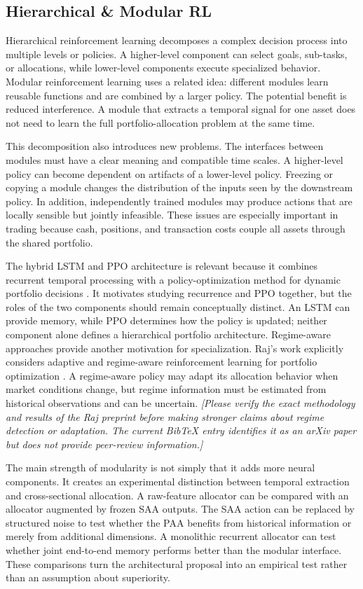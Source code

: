 \subsection{Hierarchical \& Modular RL}


Hierarchical reinforcement learning decomposes a complex decision process into multiple levels or policies. A higher-level component can select goals, sub-tasks, or allocations, while lower-level components execute specialized behavior. Modular reinforcement learning uses a related idea: different modules learn reusable functions and are combined by a larger policy. The potential benefit is reduced interference. A module that extracts a temporal signal for one asset does not need to learn the full portfolio-allocation problem at the same time.

This decomposition also introduces new problems. The interfaces between modules must have a clear meaning and compatible time scales. A higher-level policy can become dependent on artifacts of a lower-level policy. Freezing or copying a module changes the distribution of the inputs seen by the downstream policy. In addition, independently trained modules may produce actions that are locally sensible but jointly infeasible. These issues are especially important in trading because cash, positions, and transaction costs couple all assets through the shared portfolio.

The hybrid LSTM and PPO architecture is relevant because it combines recurrent temporal processing with a policy-optimization method for dynamic portfolio decisions \cite{JunKevin.2025}. It motivates studying recurrence and PPO together, but the roles of the two components should remain conceptually distinct. An LSTM can provide memory, while PPO determines how the policy is updated; neither component alone defines a hierarchical portfolio architecture. Regime-aware approaches provide another motivation for specialization. Raj's work explicitly considers adaptive and regime-aware reinforcement learning for portfolio optimization \cite{GabrielNixonRaj.2025}. A regime-aware policy may adapt its allocation behavior when market conditions change, but regime information must be estimated from historical observations and can be uncertain. \textit{[Please verify the exact methodology and results of the Raj preprint before making stronger claims about regime detection or adaptation. The current BibTeX entry identifies it as an arXiv paper but does not provide peer-review information.]}

The main strength of modularity is not simply that it adds more neural components. It creates an experimental distinction between temporal extraction and cross-sectional allocation. A raw-feature allocator can be compared with an allocator augmented by frozen SAA outputs. The SAA action can be replaced by structured noise to test whether the PAA benefits from historical information or merely from additional dimensions. A monolithic recurrent allocator can test whether joint end-to-end memory performs better than the modular interface. These comparisons turn the architectural proposal into an empirical test rather than an assumption about superiority.

